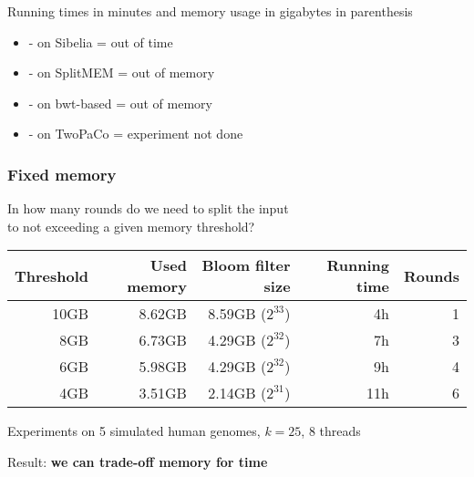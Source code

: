 \begin{frame}
{\begin{tabular}{ | r | r | r | r | r | r | r | }
    \end{tabular}
    
    }

    \medskip

    Running times in minutes and memory usage in gigabytes in parenthesis
        
    \medskip
    
    \begin{itemize}
      \item - on Sibelia = out of time
      \item - on SplitMEM = out of memory
      \item - on bwt-based = out of memory
      \item - on TwoPaCo = experiment not done
    \end{itemize}

\end{frame}


\begin{frame}
	\frametitle{Fixed memory}
	\centering
	
	In how many rounds do we need to split the input\\ to not exceeding a given memory threshold?
	
	\pause

	\bigskip
		
	\begin{tabular}{ | r | r | r | r | r | }
  \hline
  Threshold  & Used memory & Bloom filter size & Running time & Rounds \\ \hline
  {\color{red}10GB}   &      8.62GB &       8.59GB ($2^{33}$) & {\color{green}4h} &      1 \\
  {\color{orange}8GB} &      6.73GB &       4.29GB ($2^{32}$) & {\color{orange}7h} &      3 \\
  {\color{orange}6GB} &      5.98GB &       4.29GB ($2^{32}$) & {\color{orange}9h} &      4 \\
  {\color{green}4GB}  &      3.51GB &       2.14GB ($2^{31}$) & {\color{red}11h} &      6 \\
  \hline
  \end{tabular}
  
  \medskip
  
  Experiments on 5 simulated human genomes, $k = 25$, 8 threads
  
  \medskip
  
  \pause
  
  Result: \textbf{we can trade-off memory for time}
  

\end{frame}

